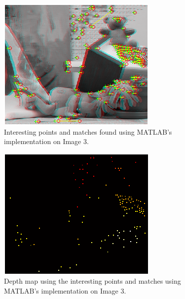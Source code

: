 \begin{figure}[H]\centering
	\includegraphics[width=0.8\linewidth]{Images/03_matlab_match.png}
	\caption{Interesting points and matches found using MATLAB's implementation on Image 3.}
	\label{fig:bear-matlab-match}
\end{figure}

\begin{figure}[H]\centering
	\includegraphics[width=0.8\linewidth]{Images/03_matlab_depth.png}
	\caption{Depth map using the interesting points and matches using MATLAB's implementation on Image 3.}
	\label{fig:bear-matlab-depth}
\end{figure}

